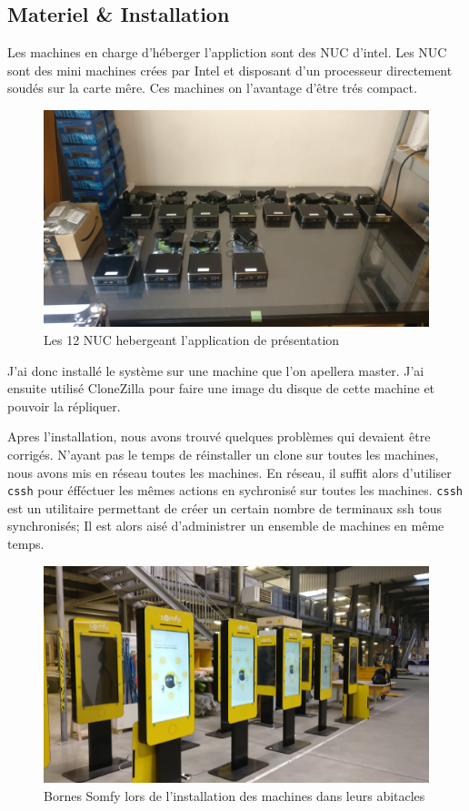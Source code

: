 
\subsection{Materiel \& Installation}

Les machines en charge d'héberger l'appliction sont des NUC d'intel.
Les NUC sont des mini machines crées par Intel et disposant d'un processeur directement soudés sur la carte mêre.
Ces machines on l'avantage d'être trés compact.

\begin{figure}[h]
    \centering
    \includegraphics[scale=0.1]{img/somfy-nuc.jpg}
    \caption{Les 12 NUC hebergeant l'application de présentation}
\end{figure}

J'ai donc installé le système sur une machine que l'on apellera master.
J'ai ensuite utilisé CloneZilla pour faire une image du disque de cette machine et pouvoir la répliquer.

Apres l'installation, nous avons trouvé quelques problèmes qui devaient être corrigés.
N'ayant pas le temps de réinstaller un clone sur toutes les machines, nous avons mis en réseau toutes les machines.
En réseau, il suffit alors d'utiliser \texttt{cssh} pour éfféctuer les mêmes actions en sychronisé sur toutes les machines.
\texttt{cssh} est un utilitaire permettant de créer un certain nombre de terminaux ssh tous synchronisés;
Il est alors aisé d'administrer un ensemble de machines en même temps.

\begin{figure}[h]
    \centering
    \includegraphics[scale=0.1]{img/somfy-install.jpg}
    \caption{Bornes Somfy lors de l'installation des machines dans leurs abitacles}
\end{figure}


